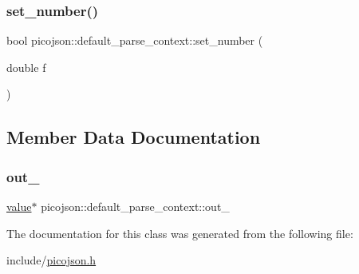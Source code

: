 \hypertarget{classpicojson_1_1default__parse__context_a9b2046a9cb6d66aad835b84ffda20b86}{}\label{classpicojson_1_1default__parse__context_a9b2046a9cb6d66aad835b84ffda20b86} 
\subsubsection{\texorpdfstring{set\+\_\+number()}{set\_number()}}
{\footnotesize\ttfamily bool picojson\+::default\+\_\+parse\+\_\+context\+::set\+\_\+number (\begin{DoxyParamCaption}\item[{double}]{f }\end{DoxyParamCaption})\hspace{0.3cm}{\ttfamily [inline]}}



\subsection{Member Data Documentation}
\hypertarget{classpicojson_1_1default__parse__context_a89547d73da32e470068649e54646ff19}{}\label{classpicojson_1_1default__parse__context_a89547d73da32e470068649e54646ff19} 
\subsubsection{\texorpdfstring{out\+\_\+}{out\_}}
{\footnotesize\ttfamily \hyperlink{classpicojson_1_1value}{value}$\ast$ picojson\+::default\+\_\+parse\+\_\+context\+::out\+\_\+\hspace{0.3cm}{\ttfamily [protected]}}



The documentation for this class was generated from the following file\+:\begin{DoxyCompactItemize}
\item 
include/\hyperlink{picojson_8h}{picojson.\+h}\end{DoxyCompactItemize}
